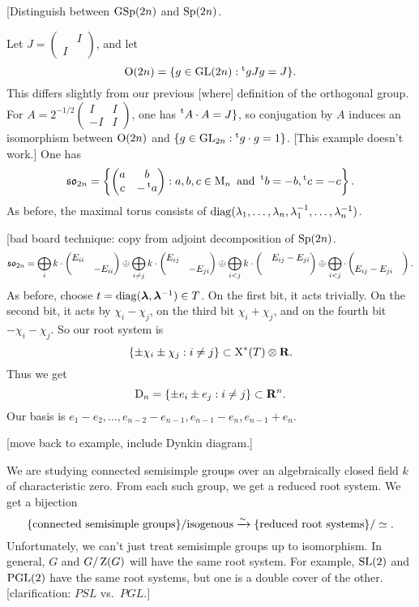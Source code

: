 \begin{example}

[Distinguish between $\operatorname{GSp}(2n)$ and $\operatorname{Sp}(2n)$. 
\end{example}

\begin{example}
Let $J=\begin{pmatrix} & I \\ I \end{pmatrix}$, and let 
\[
  \operatorname{O}(2n) = \{g\in \operatorname{GL}(2n):\prescript{\mathrm{t}}{}{g} J g=J\} .
\]
This differs slightly from our previous [where] definition of the orthogonal 
group. For $A=2^{-1/2} \begin{pmatrix} I & I \\ - I & I \end{pmatrix}$, 
one has $\prescript{\mathrm{t}}{}{A}\cdot A=J\}$, so conjugation by $A$ induces an isomorphism 
between $\operatorname{O}(2n)$ and $\{g\in \operatorname{GL}_{2n}:\prescript{\mathrm{t}}{}{g}\cdot g=1\}$. [This example 
doesn't work.] One has 
\[
  \mathfrak{so}_{2n} = \left\{\begin{pmatrix} a & b \\ c & -\prescript{\mathrm{t}}{}{a} \end{pmatrix}:a,b,c\in \operatorname{M}_n\text{ and }\prescript{\mathrm{t}}{}{b}=-b,\prescript{\mathrm{t}}{}{c}=-c\right\} .
\]
As before, the maximal torus consists of
$\operatorname{diag}(\lambda_1,\dots,\lambda_n,\lambda_1^{-1},\dots,\lambda_n^{-1})$. 

[bad board technique: copy from adjoint decomposition of $\operatorname{Sp}(2n)$. 
\[
  \mathfrak{so}_{2n} = \bigoplus_i k\cdot \begin{pmatrix} E_{ii} &  \\  & -E_{ii} \end{pmatrix} \oplus \bigoplus_{i\ne j} k\cdot \begin{pmatrix} E_{i j} &  \\  & -E_{j i} \end{pmatrix}\oplus \bigoplus_{i<j} k\cdot \begin{pmatrix}  & E_{i j}-E_{j i} \\  &  \end{pmatrix} \oplus \bigoplus_{i<j} \cdot \begin{pmatrix}  &  \\ E_{i j}-E_{j i} &  \end{pmatrix} .
\]
As before, choose $t=\operatorname{diag}(\bm\lambda,\bm\lambda^{-1})\in T$. On the 
first bit, it acts trivially. On the second bit, it acts by 
$\chi_i-\chi_j$, on the third bit $\chi_i+\chi_j$, and on the fourth bit
$-\chi_i-\chi_j$. So our root system is 
\[
  \{\pm \chi_i\pm\chi_j:i\ne j\}\subset \operatorname{X}^\ast(T)\otimes\mathbf{R} .
\]
Thus we get 
\[
  \mathrm{D}_n = \{\pm e_i\pm e_j:i\ne j\}\subset \mathbf{R}^n . 
\]
Our basis is $e_1-e_2,\dots,e_{n-2}-e_{n-1},e_{n-1}-e_n,e_{n-1}+e_n$. 

[move back to example, include Dynkin diagram.]
\end{example}

We are studying connected semisimple groups over an algebraically closed 
field $k$ of characteristic zero. From each such group, we get a reduced root 
system. We get a bijection 
\[
  \{\text{connected semisimple groups}\}/\text{isogenous} \xrightarrow\sim \{\text{reduced root systems}\} /\simeq .
\]
Unfortunately, we can't just treat semisimple groups up to isomorphism. In 
general, $G$ and $G/\operatorname{Z}(G)$ will have the same root system. For example, 
$\operatorname{SL}(2)$ and $\operatorname{PGL}(2)$ have the same root systems, but one is a double cover of 
the other. [clarification: $PSL$ vs.~$PGL$.]

